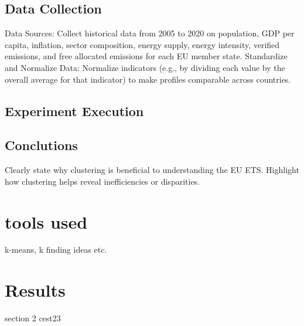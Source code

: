 \subsection{Data Collection}
Data Sources:
Collect historical data from 2005 to 2020 on population, GDP per capita, inflation, sector composition, energy supply, energy intensity, verified emissions, and free allocated emissions for each EU member state.
Standardize and Normalize Data:
Normalize indicators (e.g., by dividing each value by the overall average for that indicator) to make profiles comparable across countries.
\subsection{Experiment Execution}

\subsection{Conclutions}

Clearly state why clustering is beneficial to understanding the EU ETS. Highlight how clustering helps reveal inefficiencies or disparities.
\section{tools used}
k-means, k finding ideas etc.
\section{Results}
section 2 cest23
\cite{dimosfair}